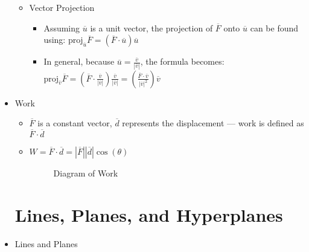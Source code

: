 \begin{itemize}
\begin{itemize}
\begin{itemize}
          \end{itemize}

      \item Vector Projection

        \begin{itemize}

          \item Assuming $\overline{u}$ is a unit vector, the projection of $\overline{F}$ onto $\overline{u}$ can be found using: $\text{proj}_{\overline{u}}\overline{F}=\left( \overline{F}\cdot\overline{u} \right)\overline{u}$

          \item In general, because $\overline{u}=\frac{\overline{v}}{|\overline{v}|}$, the formula becomes: $\text{proj}_{\overline{v}}\overline{F}=\left( \overline{F}\cdot\frac{\overline{v}}{|\overline{v}|} \right)\frac{\overline{v}}{|\overline{v}|}=\left( \frac{\overline{F}\cdot\overline{v}}{|\overline{v}|^2} \right)\overline{v}$

        \end{itemize}

    \end{itemize}

    \newpage

    \item Work

      \begin{itemize}

        \item $\overline{F}$ is a constant vector, $\overline{d}$ represents the displacement — work is defined as $\overline{F}\cdot\overline{d}$

        \item $W=\overline{F}\cdot\overline{d}=|\overline{F}||\overline{d}|\cos(\theta)$\\

        \begin{figure}[h!]
          \centering 
          \caption{Diagram of Work}
        \end{figure}

      \end{itemize}

  \section{Lines, Planes, and Hyperplanes}

    \item Lines and Planes


\end{itemize}

